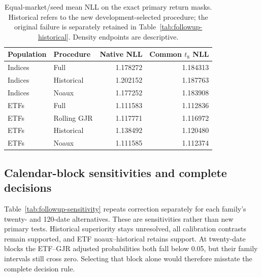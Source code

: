\begin{table}[!htbp]\centering\small
\caption[Descriptive follow-up density losses]{Equal-market/seed mean NLL on the exact primary return masks. Historical refers to the new development-selected procedure; the original failure is separately retained in Table~\ref{tab:followup-historical}. Density endpoints are descriptive.}
\label{tab:followup-density}
\begin{tabular}{llrr}
\toprule Population & Procedure & Native NLL & Common $t_8$ NLL \\
\midrule
Indices & Full & 1.178272 & 1.184313 \\
Indices & Historical & 1.202152 & 1.187763 \\
Indices & Noaux & 1.177252 & 1.183908 \\
ETFs & Full & 1.111583 & 1.112836 \\
ETFs & Rolling GJR & 1.117771 & 1.116972 \\
ETFs & Historical & 1.138492 & 1.120480 \\
ETFs & Noaux & 1.111585 & 1.112374 \\
\bottomrule\end{tabular}\end{table}
\FloatBarrier

\subsection{Calendar-block sensitivities and complete decisions}

Table~\ref{tab:followup-sensitivity} repeats correction separately for each family's twenty- and 120-date alternatives. These are sensitivities rather than new primary tests. Historical superiority stays unresolved, all calibration contrasts remain supported, and ETF noaux--historical retains support. At twenty-date blocks the ETF--GJR adjusted probabilities both fall below 0.05, but their family intervals still cross zero. Selecting that block alone would therefore misstate the complete decision rule.

